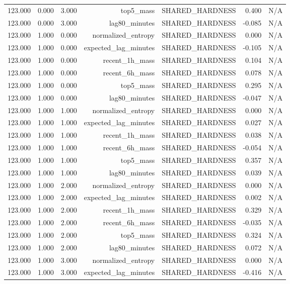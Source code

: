 \begin{table}[h!]
\begin{tabular}{lrrrrrr}
123.000 & 0.000 & 3.000 & top5\_mass & SHARED\_HARDNESS & 0.400 & N/A \\
123.000 & 0.000 & 3.000 & lag80\_minutes & SHARED\_HARDNESS & -0.085 & N/A \\
123.000 & 1.000 & 0.000 & normalized\_entropy & SHARED\_HARDNESS & 0.000 & N/A \\
123.000 & 1.000 & 0.000 & expected\_lag\_minutes & SHARED\_HARDNESS & -0.105 & N/A \\
123.000 & 1.000 & 0.000 & recent\_1h\_mass & SHARED\_HARDNESS & 0.104 & N/A \\
123.000 & 1.000 & 0.000 & recent\_6h\_mass & SHARED\_HARDNESS & 0.078 & N/A \\
123.000 & 1.000 & 0.000 & top5\_mass & SHARED\_HARDNESS & 0.295 & N/A \\
123.000 & 1.000 & 0.000 & lag80\_minutes & SHARED\_HARDNESS & -0.047 & N/A \\
123.000 & 1.000 & 1.000 & normalized\_entropy & SHARED\_HARDNESS & 0.000 & N/A \\
123.000 & 1.000 & 1.000 & expected\_lag\_minutes & SHARED\_HARDNESS & 0.027 & N/A \\
123.000 & 1.000 & 1.000 & recent\_1h\_mass & SHARED\_HARDNESS & 0.038 & N/A \\
123.000 & 1.000 & 1.000 & recent\_6h\_mass & SHARED\_HARDNESS & -0.054 & N/A \\
123.000 & 1.000 & 1.000 & top5\_mass & SHARED\_HARDNESS & 0.357 & N/A \\
123.000 & 1.000 & 1.000 & lag80\_minutes & SHARED\_HARDNESS & 0.039 & N/A \\
123.000 & 1.000 & 2.000 & normalized\_entropy & SHARED\_HARDNESS & 0.000 & N/A \\
123.000 & 1.000 & 2.000 & expected\_lag\_minutes & SHARED\_HARDNESS & 0.002 & N/A \\
123.000 & 1.000 & 2.000 & recent\_1h\_mass & SHARED\_HARDNESS & 0.329 & N/A \\
123.000 & 1.000 & 2.000 & recent\_6h\_mass & SHARED\_HARDNESS & -0.035 & N/A \\
123.000 & 1.000 & 2.000 & top5\_mass & SHARED\_HARDNESS & 0.324 & N/A \\
123.000 & 1.000 & 2.000 & lag80\_minutes & SHARED\_HARDNESS & 0.072 & N/A \\
123.000 & 1.000 & 3.000 & normalized\_entropy & SHARED\_HARDNESS & 0.000 & N/A \\
123.000 & 1.000 & 3.000 & expected\_lag\_minutes & SHARED\_HARDNESS & -0.416 & N/A \\

\end{tabular}
\end{table}
